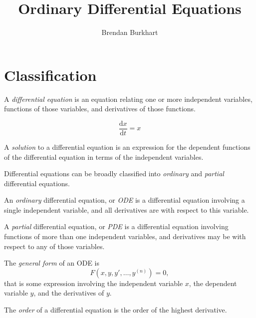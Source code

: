 \documentclass[12pt]{article}
\begin{document}
\title{Ordinary Differential Equations}
\author{Brendan Burkhart}
\maketitle

\tableofcontents
\newpage

\section{Classification}

\begin{defn}
    A \emph{differential equation} is an equation relating one or more independent variables, functions of those variables, and derivatives of those functions.
\end{defn}

\begin{exmp}\label{first-order-ode}
    \[\frac{\mathrm{d}x}{\mathrm{d}t} = x\]
\end{exmp}

\begin{defn}
    A \emph{solution} to a differential equation is an expression for the dependent functions of the differential equation in terms of the independent variables.
\end{defn}

Differential equations can be broadly classified into \emph{ordinary} and \emph{partial} differential equations.

\begin{defn}
    An \emph{ordinary} differential equation, or \emph{ODE} is a differential equation involving a single independent variable, and all derivatives are with respect to this variable.
\end{defn}

\begin{defn}
    A \emph{partial} differential equation, or \emph{PDE} is a differential equation involving functions of more than one independent variables, and derivatives may be with respect to any of those variables.
\end{defn}

\begin{defn}
    The \emph{general form} of an ODE is
    \[F(x, y, y', \ldots, y^{(n)}) = 0,\] that is some expression involving the independent variable $x$, the dependent variable $y$, and the derivatives of $y$.
\end{defn}

\begin{defn}
    The \emph{order} of a differential equation is the order of the highest derivative.
\end{defn}
\end{document}
